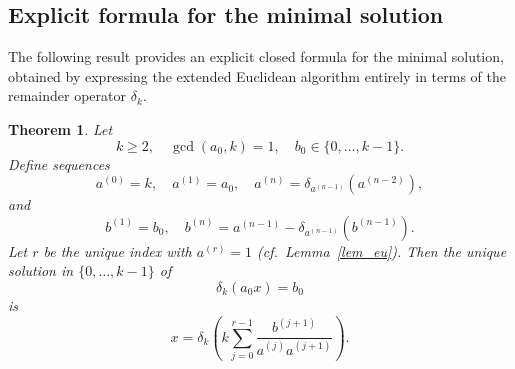 \documentclass[12pt]{article}
\newtheorem{theorem}{Theorem}[section]
\begin{document}
\subsection{Explicit formula for the minimal solution}

The following result provides an explicit closed formula for the minimal solution,
obtained by expressing the extended Euclidean algorithm entirely in terms of the
remainder operator $\delta_k$.

\begin{theorem}\label{thm:min_sol_afrc}
Let
\[
k \ge 2,
\quad
\gcd(a_0,k)=1,
\quad
b_0 \in \{0,\dots,k-1\}.
\]
Define sequences
\[
a^{(0)}=k,\quad a^{(1)}=a_0,\quad
a^{(n)}=\delta_{a^{(n-1)}}(a^{(n-2)}),
\]
and
\[
b^{(1)}=b_0,\quad
b^{(n)}=a^{(n-1)}-\delta_{a^{(n-1)}}(b^{(n-1)}).
\]
Let $r$ be the unique index with $a^{(r)}=1$ (cf.\ Lemma~\ref{lem_eu}).
Then the unique solution in $\{0,\dots,k-1\}$ of
\[
\delta_k(a_0 x)=b_0
\]
is
\[
x =
\delta_k\!\left(
k\sum_{j=0}^{r-1}
\frac{b^{(j+1)}}{a^{(j)}a^{(j+1)}}
\right).
\]
\end{theorem}
\end{document}
